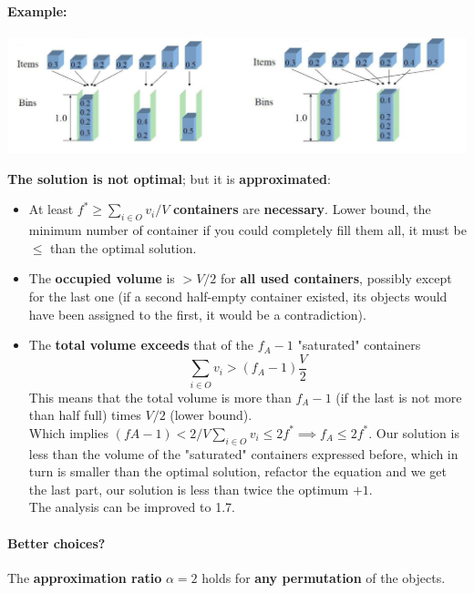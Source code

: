 \documentclass[11pt]{article}
\begin{document}
	\paragraph{Example:}
	\begin{center}
		\includegraphics[width=\columnwidth]{img/CHBPP1}
	\end{center}
	\textbf{The solution is not optimal}; but it is \textbf{approximated}:
	\begin{itemize}
		\item At least $f^\ast \geq \sum_{i \in O} v_i / V$ \textbf{containers} are \textbf{necessary}. Lower bound, the minimum number of container if you could completely fill them all, it must be $\leq$ than the optimal solution.\\
		
		\item The \textbf{occupied volume} is $> V/2$ for \textbf{all used containers}, possibly except for the last one (if a second half-empty container existed, its objects would have been assigned to the first, it would be a contradiction).\\
		
		\item The \textbf{total volume exceeds} that of the $f_A − 1$ "saturated" containers
		$$ \sum_{i \in O} v_i > (f_A - 1)\frac{V}{2} $$
		This means that the total volume is more than $f_A - 1$ (if the last is not more than half full) times $V/2$ (lower bound).\\
		Which implies $(fA − 1) < 2/V \sum_{i \in O} v_i \leq 2f^\ast \implies f_A \leq 2f^\ast$. Our solution is less than the volume of the "saturated" containers expressed before, which in turn is smaller than the optimal solution, refactor the equation and we get the last part, our solution is less than twice the optimum $+1$.\\
		The analysis can be improved to 1.7.\\
	\end{itemize}
	
	\newpage
	
	\paragraph{Better choices?} The \textbf{approximation ratio} $\alpha = 2$ holds for \textbf{any permutation} of the objects.\\
	
\end{document}
